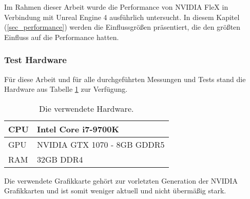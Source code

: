 
Im Rahmen dieser Arbeit wurde die Performance von NVIDIA FleX in Verbindung mit Unreal Engine 4 ausführlich untersucht. In diesem Kapitel (\ref{sec_performance}) werden die Einflussgrößen präsentiert, die den größten Einfluss auf die Performance hatten.

\subsubsection{Test Hardware}

Für diese Arbeit und für alle durchgeführten Messungen und Tests stand die Hardware aus Tabelle \ref{table_hardware} zur Verfügung.


\begin{table}[]
\centering
\caption{Die verwendete Hardware.}
\label{table_hardware}
\begin{tabular}{l|l}
 \hline
CPU & Intel Core i7-9700K  \\ \hline
GPU & NVIDIA GTX 1070 - 8GB GDDR5      \\ \hline
RAM & 32GB DDR4            \\ \hline
\end{tabular}
\end{table}

Die verwendete Grafikkarte gehört zur vorletzten Generation der NVIDIA Grafikkarten und ist somit weniger aktuell und nicht übermäßig stark.


